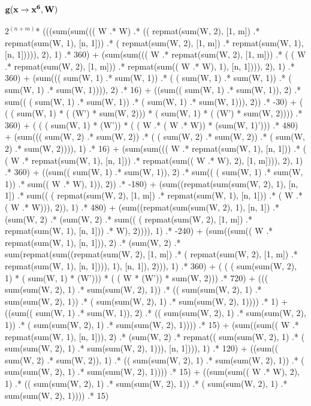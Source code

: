 \documentclass{article}
\begin{document}
\subsection{{$\bf g(x \rightarrow x^6, W)$}}
$2^{(n+m)}$* (((sum(sum((( W .* W)  .* (( repmat(sum(W, 2), [1, m]) .* repmat(sum(W, 1), [n, 1]))  .* ( repmat(sum(W, 2), [1, m]) .* repmat(sum(W, 1), [n, 1])))), 2), 1)  .* 360) 
  + (sum(sum((( W .* repmat(sum(W, 2), [1, m]))  .* ( ( W .* repmat(sum(W, 2), [1, m])) .* repmat(sum(( W .* W), 1), [n, 1]))), 2), 1)  .* 360) 
  + (sum((( sum(W, 1) .* sum(W, 1))  .* ( ( sum(W, 1) .* sum(W, 1)) .* ( sum(W, 1) .* sum(W, 1)))), 2)  .* 16) 
  + ((sum(( sum(W, 1) .* sum(W, 1)), 2)  .* sum(( ( sum(W, 1) .* sum(W, 1)) .* ( sum(W, 1) .* sum(W, 1))), 2))  .* -30) 
  + ( ( ( sum(W, 1) * ( (W') * sum(W, 2))) * ( sum(W, 1) * ( (W') * sum(W, 2)))) .* 360) 
  + ( ( ( sum(W, 1) * (W')) * ( ( W .* ( W .* W)) * (sum(W, 1)'))) .* 480) 
  + (sum((( sum(W, 2) .* sum(W, 2))  .* ( ( sum(W, 2) .* sum(W, 2)) .* ( sum(W, 2) .* sum(W, 2)))), 1)  .* 16) 
  + (sum(sum((( W .* repmat(sum(W, 1), [n, 1]))  .* ( ( W .* repmat(sum(W, 1), [n, 1])) .* repmat(sum(( W .* W), 2), [1, m]))), 2), 1)  .* 360) 
  + ((sum(( sum(W, 1) .* sum(W, 1)), 2)  .* sum(( ( sum(W, 1) .* sum(W, 1)) .* sum(( W .* W), 1)), 2))  .* -180) 
  + (sum((repmat(sum(sum(W, 2), 1), [n, 1])  .* sum(( ( repmat(sum(W, 2), [1, m]) .* repmat(sum(W, 1), [n, 1])) .* ( W .* ( W .* W))), 2)), 1)  .* 480) 
  + (sum((repmat(sum(sum(W, 2), 1), [n, 1])  .* (sum(W, 2)  .* (sum(W, 2)  .* sum(( ( repmat(sum(W, 2), [1, m]) .* repmat(sum(W, 1), [n, 1])) .* W), 2)))), 1)  .* -240) 
  + (sum((sum(( W .* repmat(sum(W, 1), [n, 1])), 2)  .* (sum(W, 2)  .* sum(repmat(sum((repmat(sum(W, 2), [1, m])  .* ( repmat(sum(W, 2), [1, m]) .* repmat(sum(W, 1), [n, 1]))), 1), [n, 1]), 2))), 1)  .* 360) 
  + ( ( ( sum(sum(W, 2), 1) * ( sum(W, 1) * (W'))) * ( ( W * (W')) * sum(W, 2))) .* 720) 
  + ((( sum(sum(W, 2), 1) .* sum(sum(W, 2), 1))  .* (( sum(sum(W, 2), 1) .* sum(sum(W, 2), 1))  .* ( sum(sum(W, 2), 1) .* sum(sum(W, 2), 1))))  .* 1) 
  + ((sum(( sum(W, 1) .* sum(W, 1)), 2)  .* (( sum(sum(W, 2), 1) .* sum(sum(W, 2), 1))  .* ( sum(sum(W, 2), 1) .* sum(sum(W, 2), 1))))  .* 15) 
  + (sum((sum(( W .* repmat(sum(W, 1), [n, 1])), 2)  .* (sum(W, 2)  .* repmat(( sum(sum(W, 2), 1) .* ( sum(sum(W, 2), 1) .* sum(sum(W, 2), 1))), [n, 1]))), 1)  .* 120) 
  + ((sum(( sum(W, 2) .* sum(W, 2)), 1)  .* (( sum(sum(W, 2), 1) .* sum(sum(W, 2), 1))  .* ( sum(sum(W, 2), 1) .* sum(sum(W, 2), 1))))  .* 15) 
  + ((sum(sum(( W .* W), 2), 1)  .* (( sum(sum(W, 2), 1) .* sum(sum(W, 2), 1))  .* ( sum(sum(W, 2), 1) .* sum(sum(W, 2), 1))))  .* 15) 
\end{document}
